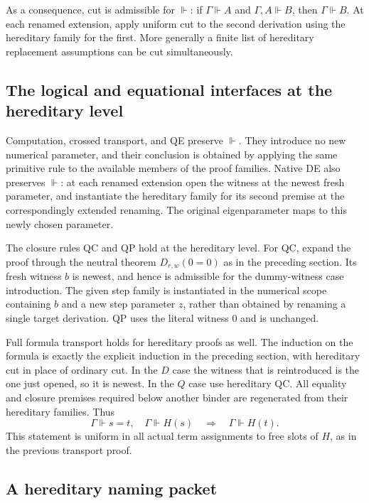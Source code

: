As a consequence, cut is admissible for $\Vdash$: if
$\Gamma\Vdash A$ and $\Gamma,A\Vdash B$, then $\Gamma\Vdash B$.
At each renamed extension, apply uniform cut to the second derivation
using the hereditary family for the first.  More generally a finite
list of hereditary replacement assumptions can be cut simultaneously.

\subsection{The logical and equational interfaces at the hereditary level}

Computation, crossed transport, and QE preserve $\Vdash$.  They introduce
no new numerical parameter, and their conclusion is obtained by applying
the same primitive rule to the available members of the proof families.
Native DE also preserves $\Vdash$: at each renamed extension open the
witness at the newest fresh parameter, and instantiate the hereditary
family for its second premise at the correspondingly extended renaming.
The original eigenparameter maps to this newly chosen parameter.

The closure rules QC and QP hold at the hereditary level.  For QC,
expand the proof through the neutral theorem $D_{r,w}(0=0)$ as in the
preceding section.  Its fresh witness $b$ is newest, and hence is
admissible for the dummy-witness case introduction.  The given step
family is instantiated in the numerical scope containing $b$ and a
new step parameter $z$, rather than obtained by renaming a single
target derivation.  QP uses the literal witness $0$ and is unchanged.

Full formula transport holds for hereditary proofs as well.  The
induction on the formula is exactly the explicit induction in the
preceding section, with hereditary cut in place of ordinary cut.
In the $D$ case the witness that is reintroduced is the one just
opened, so it is newest.  In the $Q$ case use hereditary QC.
All equality and closure premises required below another binder are
regenerated from their hereditary families.  Thus
\[
 \Gamma\Vdash s=t,\quad\Gamma\Vdash H(s)
 \quad\Longrightarrow\quad\Gamma\Vdash H(t).
 \tag{HL}
\]
This statement is uniform in all actual term assignments to free
slots of $H$, as in the previous transport proof.

\subsection{A hereditary naming packet}

